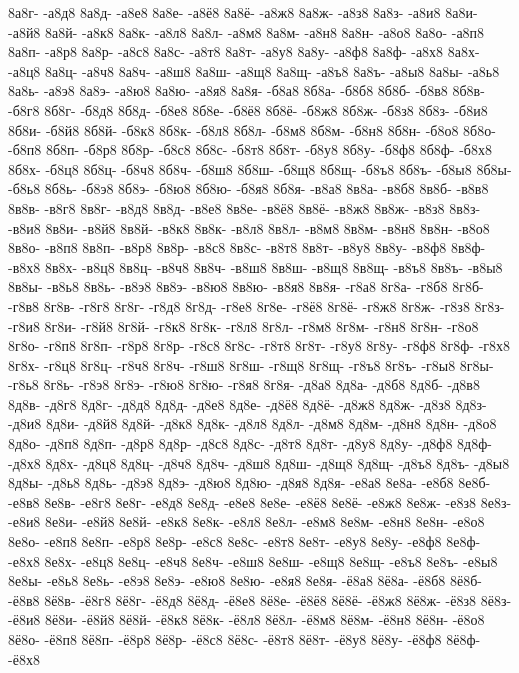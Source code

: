 {8а8г-
-а8д8
8а8д-
-а8е8
8а8е-
-а8ё8
8а8ё-
-а8ж8
8а8ж-
-а8з8
8а8з-
-а8и8
8а8и-
-а8й8
8а8й-
-а8к8
8а8к-
-а8л8
8а8л-
-а8м8
8а8м-
-а8н8
8а8н-
-а8о8
8а8о-
-а8п8
8а8п-
-а8р8
8а8р-
-а8с8
8а8с-
-а8т8
8а8т-
-а8у8
8а8у-
-а8ф8
8а8ф-
-а8х8
8а8х-
-а8ц8
8а8ц-
-а8ч8
8а8ч-
-а8ш8
8а8ш-
-а8щ8
8а8щ-
-а8ъ8
8а8ъ-
-а8ы8
8а8ы-
-а8ь8
8а8ь-
-а8э8
8а8э-
-а8ю8
8а8ю-
-а8я8
8а8я-
-б8а8
8б8а-
-б8б8
8б8б-
-б8в8
8б8в-
-б8г8
8б8г-
-б8д8
8б8д-
-б8е8
8б8е-
-б8ё8
8б8ё-
-б8ж8
8б8ж-
-б8з8
8б8з-
-б8и8
8б8и-
-б8й8
8б8й-
-б8к8
8б8к-
-б8л8
8б8л-
-б8м8
8б8м-
-б8н8
8б8н-
-б8о8
8б8о-
-б8п8
8б8п-
-б8р8
8б8р-
-б8с8
8б8с-
-б8т8
8б8т-
-б8у8
8б8у-
-б8ф8
8б8ф-
-б8х8
8б8х-
-б8ц8
8б8ц-
-б8ч8
8б8ч-
-б8ш8
8б8ш-
-б8щ8
8б8щ-
-б8ъ8
8б8ъ-
-б8ы8
8б8ы-
-б8ь8
8б8ь-
-б8э8
8б8э-
-б8ю8
8б8ю-
-б8я8
8б8я-
-в8а8
8в8а-
-в8б8
8в8б-
-в8в8
8в8в-
-в8г8
8в8г-
-в8д8
8в8д-
-в8е8
8в8е-
-в8ё8
8в8ё-
-в8ж8
8в8ж-
-в8з8
8в8з-
-в8и8
8в8и-
-в8й8
8в8й-
-в8к8
8в8к-
-в8л8
8в8л-
-в8м8
8в8м-
-в8н8
8в8н-
-в8о8
8в8о-
-в8п8
8в8п-
-в8р8
8в8р-
-в8с8
8в8с-
-в8т8
8в8т-
-в8у8
8в8у-
-в8ф8
8в8ф-
-в8х8
8в8х-
-в8ц8
8в8ц-
-в8ч8
8в8ч-
-в8ш8
8в8ш-
-в8щ8
8в8щ-
-в8ъ8
8в8ъ-
-в8ы8
8в8ы-
-в8ь8
8в8ь-
-в8э8
8в8э-
-в8ю8
8в8ю-
-в8я8
8в8я-
-г8а8
8г8а-
-г8б8
8г8б-
-г8в8
8г8в-
-г8г8
8г8г-
-г8д8
8г8д-
-г8е8
8г8е-
-г8ё8
8г8ё-
-г8ж8
8г8ж-
-г8з8
8г8з-
-г8и8
8г8и-
-г8й8
8г8й-
-г8к8
8г8к-
-г8л8
8г8л-
-г8м8
8г8м-
-г8н8
8г8н-
-г8о8
8г8о-
-г8п8
8г8п-
-г8р8
8г8р-
-г8с8
8г8с-
-г8т8
8г8т-
-г8у8
8г8у-
-г8ф8
8г8ф-
-г8х8
8г8х-
-г8ц8
8г8ц-
-г8ч8
8г8ч-
-г8ш8
8г8ш-
-г8щ8
8г8щ-
-г8ъ8
8г8ъ-
-г8ы8
8г8ы-
-г8ь8
8г8ь-
-г8э8
8г8э-
-г8ю8
8г8ю-
-г8я8
8г8я-
-д8а8
8д8а-
-д8б8
8д8б-
-д8в8
8д8в-
-д8г8
8д8г-
-д8д8
8д8д-
-д8е8
8д8е-
-д8ё8
8д8ё-
-д8ж8
8д8ж-
-д8з8
8д8з-
-д8и8
8д8и-
-д8й8
8д8й-
-д8к8
8д8к-
-д8л8
8д8л-
-д8м8
8д8м-
-д8н8
8д8н-
-д8о8
8д8о-
-д8п8
8д8п-
-д8р8
8д8р-
-д8с8
8д8с-
-д8т8
8д8т-
-д8у8
8д8у-
-д8ф8
8д8ф-
-д8х8
8д8х-
-д8ц8
8д8ц-
-д8ч8
8д8ч-
-д8ш8
8д8ш-
-д8щ8
8д8щ-
-д8ъ8
8д8ъ-
-д8ы8
8д8ы-
-д8ь8
8д8ь-
-д8э8
8д8э-
-д8ю8
8д8ю-
-д8я8
8д8я-
-е8а8
8е8а-
-е8б8
8е8б-
-е8в8
8е8в-
-е8г8
8е8г-
-е8д8
8е8д-
-е8е8
8е8е-
-е8ё8
8е8ё-
-е8ж8
8е8ж-
-е8з8
8е8з-
-е8и8
8е8и-
-е8й8
8е8й-
-е8к8
8е8к-
-е8л8
8е8л-
-е8м8
8е8м-
-е8н8
8е8н-
-е8о8
8е8о-
-е8п8
8е8п-
-е8р8
8е8р-
-е8с8
8е8с-
-е8т8
8е8т-
-е8у8
8е8у-
-е8ф8
8е8ф-
-е8х8
8е8х-
-е8ц8
8е8ц-
-е8ч8
8е8ч-
-е8ш8
8е8ш-
-е8щ8
8е8щ-
-е8ъ8
8е8ъ-
-е8ы8
8е8ы-
-е8ь8
8е8ь-
-е8э8
8е8э-
-е8ю8
8е8ю-
-е8я8
8е8я-
-ё8а8
8ё8а-
-ё8б8
8ё8б-
-ё8в8
8ё8в-
-ё8г8
8ё8г-
-ё8д8
8ё8д-
-ё8е8
8ё8е-
-ё8ё8
8ё8ё-
-ё8ж8
8ё8ж-
-ё8з8
8ё8з-
-ё8и8
8ё8и-
-ё8й8
8ё8й-
-ё8к8
8ё8к-
-ё8л8
8ё8л-
-ё8м8
8ё8м-
-ё8н8
8ё8н-
-ё8о8
8ё8о-
-ё8п8
8ё8п-
-ё8р8
8ё8р-
-ё8с8
8ё8с-
-ё8т8
8ё8т-
-ё8у8
8ё8у-
-ё8ф8
8ё8ф-
-ё8х8
}
